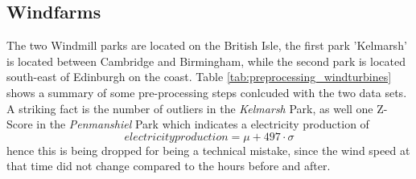 \documentclass{article}
\begin{document}
\subsection{Windfarms}

The two Windmill parks are located on the British Isle, the first park 'Kelmarsh' is located between Cambridge and Birmingham, while the second park is located south-east of Edinburgh on the coast. 
Table \ref{tab:preprocessing_windturbines} shows a summary of some pre-processing steps conlcuded with the two data sets. A striking fact is the number of outliers in the \textit{Kelmarsh} Park, as well one Z-Score in the \textit{Penmanshiel} Park which indicates a electricity production of
\begin{equation*}
    electricity production = \mu + 497 \cdot \sigma
\end{equation*}
hence this is being dropped for being a technical mistake, since the wind speed at that time did not change compared to the hours before and after. 
\end{document}
